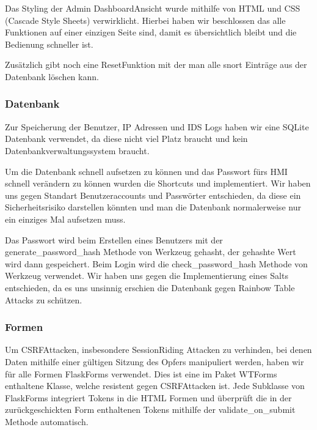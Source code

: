 \documentclass[letterpaper,10pt,ngerman]{sphinxmanual}
\begin{document}
Das Styling der Admin Dashboard\sphinxhyphen{}Ansicht wurde mithilfe von HTML und CSS (Cascade Style Sheets) verwirklicht. Hierbei haben wir beschlossen das alle Funktionen auf einer einzigen Seite sind, damit es übersichtlich bleibt und die Bedienung schneller ist.


Zusätzlich gibt noch eine Reset\sphinxhyphen{}Funktion mit der man alle snort Einträge aus der Datenbank löschen kann.


\subsubsection{Datenbank}
\label{\detokenize{webapp:datenbank}}
Zur Speicherung der Benutzer, IP Adressen und IDS Logs haben wir eine SQLite Datenbank verwendet, da diese nicht viel Platz braucht und kein Datenbankverwaltungssystem braucht.

Um die Datenbank schnell aufsetzen zu können und das Passwort fürs HMI schnell verändern zu können wurden die Shortcuts  und  implementiert. Wir haben uns gegen Standart Benutzeraccounts und Passwörter entschieden, da diese ein Sicherheitsrisiko darstellen könnten und man die Datenbank normalerweise nur ein einziges Mal aufsetzen muss.

Das Passwort wird beim Erstellen eines Benutzers mit der generate\_password\_hash Methode von Werkzeug gehasht, der gehashte Wert wird dann gespeichert. Beim Login wird die check\_password\_hash Methode von Werkzeug verwendet. Wir haben uns gegen die Implementierung eines Salts entschieden, da es uns unsinnig erschien die Datenbank gegen Rainbow Table Attacks zu schützen.


\subsubsection{Formen}
\label{\detokenize{webapp:formen}}
Um CSRF\sphinxhyphen{}Attacken, insbesondere Session\sphinxhyphen{}Riding Attacken zu verhinden, bei denen Daten mithilfe einer gültigen Sitzung des Opfers manipuliert werden, haben wir für alle Formen FlaskForms verwendet. Dies ist eine im Paket WTForms enthaltene Klasse, welche resistent gegen CSRF\sphinxhyphen{}Attacken ist. Jede Subklasse von FlaskForms integriert Tokens in die HTML Formen und überprüft die in der zurückgeschickten Form enthaltenen Tokens mithilfe der validate\_on\_submit Methode automatisch.
\end{document}
